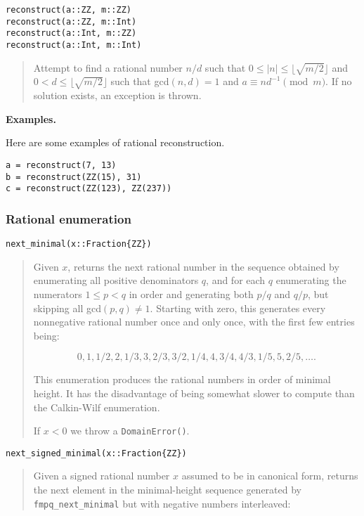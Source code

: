 \documentclass[a4paper,10pt]{article}
\newcommand{\code}{\lstinline}
\newcommand{\desc}[1]{\vspace{-3mm}\begin{quote}#1\end{quote}}
\begin{document}
{{\begin{lstlisting}
reconstruct(a::ZZ, m::ZZ)
reconstruct(a::ZZ, m::Int)
reconstruct(a::Int, m::ZZ)
reconstruct(a::Int, m::Int)
\end{lstlisting}

\desc{Attempt to find a rational number $n/d$ such that 
$0 \leq |n| \leq \lfloor\sqrt{m/2}\rfloor$ and 
$0 < d \leq \lfloor\sqrt{m/2}\rfloor$ such that gcd$(n, d) = 1$ and
$a \equiv nd^{-1} \pmod{m}$. If no solution exists, an exception is thrown.}

\textbf{Examples.}

Here are some examples of rational reconstruction.

\begin{lstlisting}
a = reconstruct(7, 13)
b = reconstruct(ZZ(15), 31)
c = reconstruct(ZZ(123), ZZ(237))
\end{lstlisting}

\subsubsection{Rational enumeration}

\begin{lstlisting}
next_minimal(x::Fraction{ZZ})
\end{lstlisting}

\desc{Given $x$, returns the next rational number in the sequence obtained by
enumerating all positive denominators $q$, and for each $q$ enumerating
the numerators $1 \le p < q$ in order and generating both $p/q$ and $q/p$,
but skipping all gcd$(p,q) \neq 1$. Starting with zero, this generates
every nonnegative rational number once and only once, with the first
few entries being:

$$0, 1, 1/2, 2, 1/3, 3, 2/3, 3/2, 1/4, 4, 3/4, 4/3, 1/5, 5, 2/5, \ldots.$$

This enumeration produces the rational numbers in order of minimal height. 
It has the disadvantage of being somewhat slower to compute than the
Calkin-Wilf enumeration.

If $x < 0$ we throw a \code{DomainError()}.}

\begin{lstlisting}
next_signed_minimal(x::Fraction{ZZ})
\end{lstlisting}

\desc{Given a signed rational number $x$ assumed to be in canonical form, 
returns the next element in the minimal-height sequence generated by 
\code{fmpq_next_minimal} but with negative numbers interleaved:

}}}
\end{document}
